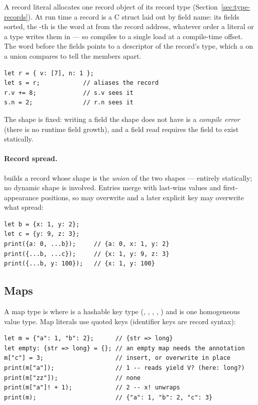 A record literal  allocates one record object
of its record type (Section~\ref{sec:type-records}). At run time a
record is a C struct laid out by field name: its fields sorted, the
-th is the word at  from the record address, whatever
order a literal or a type writes them in --- so  compiles to a
single load at a compile-time offset. The word before the fields points
to a descriptor of the record's type, which a  on a union
compares to tell the members apart.

\begin{lstlisting}
let r = { v: [7], n: 1 };
let s = r;            // aliases the record
r.v += 8;             // s.v sees it
s.n = 2;              // r.n sees it
\end{lstlisting}

\noindent The shape is fixed: writing a field the shape does not have is
a \emph{compile error} (there is no runtime field growth), and a field
read requires the field to exist statically.

\paragraph{Record spread.}  builds a record whose
shape is the \emph{union} of the two shapes --- entirely statically; no
dynamic shape is involved. Entries merge with last-wins values and
first-appearance positions, so  may overwrite  and a later
explicit key may overwrite what  spread:

\begin{lstlisting}
let b = {x: 1, y: 2};
let c = {y: 9, z: 3};
print({a: 0, ...b});     // {a: 0, x: 1, y: 2}
print({...b, ...c});     // {x: 1, y: 9, z: 3}
print({...b, y: 100});   // {x: 1, y: 100}
\end{lstlisting}

\subsection{Maps}
\label{sec:maps}

A map type is  where  is a hashable key
type (, , , , ) and 
is one homogeneous value type. Map literals use quoted keys (identifier
keys are record syntax):

\begin{lstlisting}
let m = {"a": 1, "b": 2};      // {str => long}
let empty: {str => long} = {}; // an empty map needs the annotation
m["c"] = 3;                    // insert, or overwrite in place
print(m["a"]);                 // 1 -- reads yield V? (here: long?)
print(m["zz"]);                // none
print(m["a"]! + 1);            // 2 -- x! unwraps
print(m);                      // {"a": 1, "b": 2, "c": 3}
\end{lstlisting}

